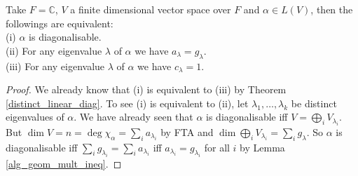 \begin{lemma}
    Take $F=\mathbb C$, $V$ a finite dimensional vector space over $F$ and $\alpha\in L(V)$, then the followings are equivalent:\\
    (i) $\alpha$ is diagonalisable.\\
    (ii) For any eigenvalue $\lambda$ of $\alpha$ we have $a_\lambda=g_\lambda$.\\
    (iii) For any eigenvalue $\lambda$ of $\alpha$ we have $c_\lambda=1$.
\end{lemma}
\begin{proof}
    We already know that (i) is equivalent to (iii) by Theorem \ref{distinct_linear_diag}.
    To see (i) is equivalent to (ii), let $\lambda_1,\ldots,\lambda_k$ be distinct eigenvalues of $\alpha$.
    We have already seen that $\alpha$ is diagonalisable iff $V=\bigoplus_iV_{\lambda_i}$.
    But $\dim V=n=\deg\chi_\alpha=\sum_ia_{\lambda_i}$ by FTA and $\dim\bigoplus_iV_{\lambda_i}=\sum_ig_\lambda$.
    So $\alpha$ is diagonalisable iff $\sum_ig_{\lambda_i}=\sum_ia_{\lambda_i}$ iff $a_{\lambda_i}=g_{\lambda_i}$ for all $i$ by Lemma \ref{alg_geom_mult_ineq}.
\end{proof}